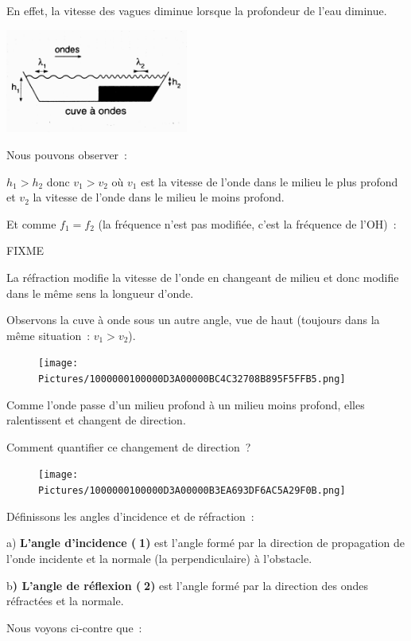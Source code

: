 En effet, la vitesse des vagues diminue lorsque la profondeur de l'eau
diminue.

\includegraphics[width=6.017cm,height=3.408cm]{Pictures/1000000100000A3C000005CCA7E68DBE45CF2A53.png}

Nous pouvons observer~:

$h_1 > h_2$ donc $v_1 > v_2$
où $v_1$ est la vitesse de l'onde dans le milieu le plus profond et $v_2$ la
vitesse de l'onde dans le milieu le moins profond.

Et comme $f_1 = f_2$ (la fréquence n'est pas modifiée, c'est la fréquence de
l'OH)~:

FIXME 

La réfraction modifie la vitesse de l'onde en changeant de milieu et
donc modifie dans le même sens la longueur d'onde.

Observons la cuve à onde sous un autre angle, vue de haut (toujours dans
la même situation~: $v_1>  v_2$).

\begin{figure}
\centering
\texttt{[image: Pictures/1000000100000D3A00000BC4C32708B895F5FFB5.png]}
\caption{}
\end{figure}

Comme l'onde passe d'un milieu profond à un milieu moins profond, elles
ralentissent et changent de direction.

Comment quantifier ce changement de direction~?

\begin{figure}
\centering
\texttt{[image: Pictures/1000000100000D3A00000B3EA693DF6AC5A29F0B.png]}
\caption{}
\end{figure}

Définissons les angles d'incidence et de réfraction~:

a) \textbf{L'angle d'incidence (1)} est l'angle formé par la direction
de propagation de l'onde incidente et la normale (la perpendiculaire) à
l'obstacle.

b\textbf{) L'angle de réflexion (2)} est l'angle formé par la direction
des ondes réfractées et la normale.

Nous voyons ci-contre que~:

